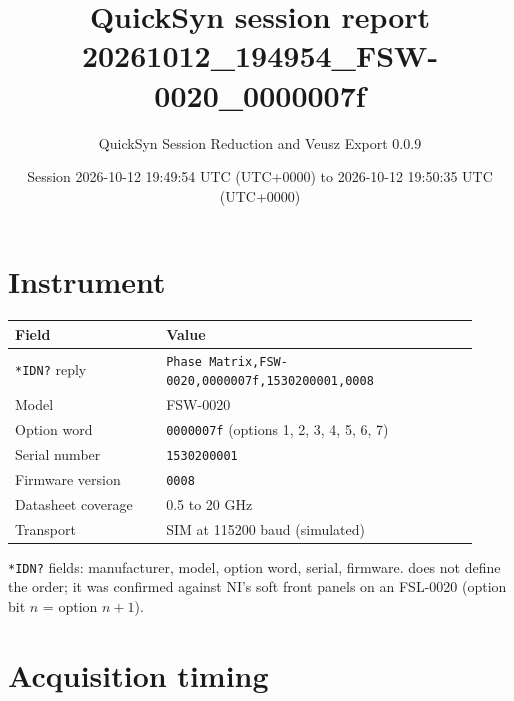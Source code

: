 \documentclass[11pt]{article}
\title{QuickSyn session report\\[0.3em]\large 20261012\_194954\_FSW-0020\_0000007f}
\author{QuickSyn Session Reduction and Veusz Export 0.0.9}
\date{Session 2026-10-12 19:49:54 UTC (UTC+0000) to 2026-10-12 19:50:35 UTC (UTC+0000)}
\begin{document}
\maketitle
\thispagestyle{fancy}
\begin{center}\end{center}

\tableofcontents
\clearpage

\section{Instrument}

\begin{center}
\begin{tabular}{@{}p{0.3\linewidth}p{0.62\linewidth}@{}}
\toprule
\textbf{Field} & \textbf{Value} \\
\midrule
\texttt{*IDN?} reply & \texttt{Phase Matrix,FSW-0020,0000007f,1530200001,0008} \\
Model & FSW-0020 \\
Option word & \texttt{0000007f} (options 1, 2, 3, 4, 5, 6, 7) \\
Serial number & \texttt{1530200001} \\
Firmware version & \texttt{0008} \\
Datasheet coverage & 0.5 to 20 GHz \\
Transport & SIM at 115200 baud (simulated) \\
\bottomrule
\end{tabular}
\end{center}

\texttt{*IDN?} fields: manufacturer, model, option word, serial, firmware.
\cite{nicomms} does not define the order; it was confirmed against NI's
soft front panels on an FSL-0020 (option bit $n$ = option $n+1$).

\section{Acquisition timing}
\end{document}
